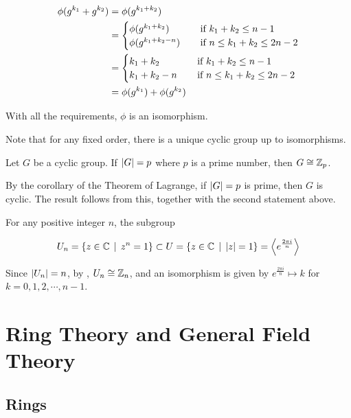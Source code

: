 \documentclass[a4paper,12pt]{article}
\begin{document}
\begin{thm}
\begin{alist}
    $$\begin{aligned}[t]
      \phi(g^{k_{1}}+g^{k_{2}})&=\phi(g^{k_{1}+k_{2}})\\
      &=\begin{cases}
        \phi(g^{k_{1}+k_{2}})&\;\;\;\;\text{if }k_{1}+k_{2}\leq n-1\\
        \phi(g^{k_{1}+k_{2}-n})&\;\;\;\;\text{if }n\leq k_{1}+k_{2}\leq 2n-2
    \end{cases}\\
    &=\begin{cases}
      k_{1}+k_{2}&\;\;\;\;\text{if }k_{1}+k_{2}\leq n-1\\
      k_{1}+k_{2}-n&\;\;\;\;\text{if }n\leq k_{1}+k_{2}\leq 2n-2
    \end{cases}\\
    &=\phi(g^{k_{1}})+\phi(g^{k_{2}})
    \end{aligned}$$\n

    With all the requirements, $\phi$ is an isomorphism.
  \end{alist}
\end{thm}\n

Note that for any fixed order, there is a unique cyclic group up to isomorphisms.\n

\begin{crl}
  Let $G$ be a cyclic group. If $\left| G\right|=p$ where $p$ is a prime number, then $G\cong\mathbb{Z}_{p}$.\n

  \prf By the corollary of the Theorem of Lagrange, if $\left| G\right|=p$ is prime, then $G$ is cyclic. The result follows from this, together with the second statement above.
\end{crl}\n

\begin{exm}
  For any positive integer $n$, the subgroup

  $$U_{n}=\left\{ z\in\mathbb{C}\,\mid\, z^{n}=1\right\}\subset U=\left\{ z\in\mathbb{C}\,\mid\, \left| z\right|=1\right\}=\left\langle e^{\frac{2\pi i}{n}}\right\rangle$$\s

  Since $\left| U_{n}\right|=n$, by \rthm[\sctd{1}], $U_{n}\cong\mathbb{Z}_{n}$, and an isomorphism is given by $e^{\frac{2\pi i}{n}}\mapsto k$ for $k=0,1,2,\cdots,n-1$.
\end{exm}

\pagebreak

\section{Ring Theory and General Field Theory}
\subsection{Rings}
\end{document}
